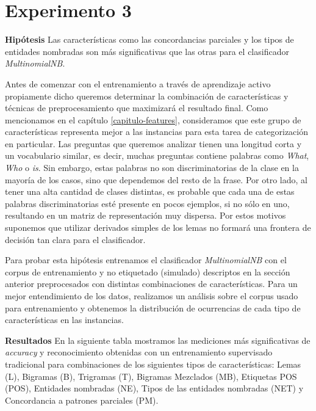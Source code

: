 \section{Experimento 3}
\vspace{3 mm}
\textbf{Hipótesis} Las características como las concordancias parciales y los tipos de entidades nombradas son más significativas que las otras para el clasificador \textit{MultinomialNB}.
\vspace{3 mm}

Antes de comenzar con el entrenamiento a través de aprendizaje activo propiamente dicho queremos determinar la combinación de características y técnicas de preprocesamiento que maximizará el resultado final. Como mencionamos en el capítulo \ref{capitulo-features}, consideramos que este grupo de características representa mejor a las instancias para esta tarea de categorización en particular. Las preguntas que queremos analizar tienen una longitud corta y un vocabulario similar, es decir, muchas preguntas contiene palabras como \textit{What}, \textit{Who} o \textit{is}. Sin embargo, estas palabras no son discriminatorias de la clase en la mayoría de los casos, sino que dependemos del resto de la frase. Por otro lado, al tener una alta cantidad de clases distintas, es probable que cada una de estas palabras discriminatorias esté presente en pocos ejemplos, si no sólo en uno, resultando en un matriz de representación muy dispersa. Por estos motivos suponemos que utilizar derivados simples de los lemas no formará una frontera de decisión tan clara para el clasificador.

Para probar esta hipótesis entrenamos el clasificador \textit{MultinomialNB} con el corpus de entrenamiento y no etiquetado (simulado) descriptos en la sección anterior preprocesados con distintas combinaciones de características. Para un mejor entendimiento de los datos, realizamos un análisis sobre el corpus usado para entrenamiento y obtenemos la distribución de ocurrencias de cada tipo de características en las instancias.

\vspace{3 mm}

\textbf{Resultados} En la siguiente tabla mostramos las mediciones más significativas de \textit{accuracy} y reconocimiento obtenidas con un entrenamiento supervisado tradicional para combinaciones de los siguientes tipos de características: Lemas (L), Bigramas (B), Trigramas (T), Bigramas Mezclados (MB), Etiquetas POS (POS), Entidades nombradas (NE), Tipos de las entidades nombradas (NET) y Concordancia a patrones parciales (PM).

